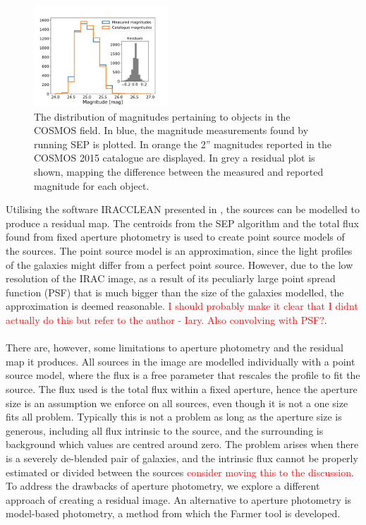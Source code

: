 \begin{figure}
    \centering %
    \includegraphics[trim={0.5cm 0 2cm 1.8cm},clip,width=0.45\textwidth]{Code/Saved_Figures/Mag_hist.pdf}
    \caption{The distribution of magnitudes pertaining to objects in the COSMOS field. In blue, the magnitude measurements found by running SEP is plotted. In orange the 2'' magnitudes reported in the COSMOS 2015 catalogue are displayed. In grey a residual plot is shown, mapping the difference between the measured and reported magnitude for each object.}
    \label{mag_hist}  
\end{figure}

Utilising the software IRACCLEAN presented in \cite{Hsieh_2012_IRACCLEAN}, the sources can be modelled to produce a residual map. The centroids from the SEP algorithm and the total flux found from fixed aperture photometry is used to create point source models of the sources. The point source model is an approximation, since the light profiles of the galaxies might differ from a perfect point source. However, due to the low resolution of the IRAC image, as a result of its peculiarly large point spread function (PSF) that is much bigger than the size of the galaxies modelled, the approximation is deemed reasonable. \textcolor{red}{I should probably make it clear that I didnt actually do this but refer to the author - Iary. Also convolving with PSF?}. \\ \\
There are, however, some limitations to aperture photometry and the residual map it produces. All sources in the image are modelled individually with a point source model, where the flux is a free parameter that rescales the profile to fit the source. The flux used is the total flux within a fixed aperture, hence the aperture size is an assumption we enforce on all sources, even though it is not a one size fits all problem. Typically this is not a problem as long as the aperture size is generous, including all flux intrinsic to the source, and the surrounding is background which values are centred around zero. The problem arises when there is a severely de-blended pair of galaxies, and the intrinsic flux cannot be properly estimated or divided between the sources \textcolor{red}{consider moving this to the discussion}. To address the drawbacks of aperture photometry, we explore a different approach of creating a residual image. An alternative to aperture photometry is model-based photometry, a method from which the Farmer tool is developed. \\

